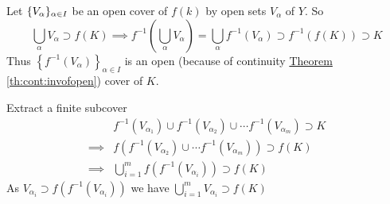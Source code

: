 \begin{myproof}
	Let $\{V_{\alpha}\}_{\alpha\in I}$ be an open cover of $f(k)$ by open sets $V_{\alpha}$ of $Y$. So $$\bigcup\limits_{\alpha}V_{\alpha} \supset f(K)\implies f^{-1}\left(\bigcup\limits_{\alpha}V_{\alpha}\right)=\bigcup\limits_{\alpha}f^{-1}\left(V_{\alpha}\right)\supset f^{-1}(f(K))\supset K$$ Thus $\left\{f^{-1}(V_{\alpha})\right\}_{\alpha\in I}$ is an open (because of continuity \hyperref[th:cont:invofopen]{Theorem \ref{th:cont:invofopen}}) cover of $K$.

	Extract a finite subcover \begin{align*}
		         & f^{-1}\left(V_{\alpha_1}\right)\cup f^{-1}\left(V_{\alpha_2}\right) \cup \cdots f^{-1}\left(V_{\alpha_m}\right)\supset K \\
		\implies & f\left(f^{-1}\left(V_{\alpha_2}\right) \cup \cdots f^{-1}\left(V_{\alpha_m}\right)\right)\supset f(K)                    \\
		\implies & \bigcup_{i=1}^m f\left(f^{-1}\left(V_{\alpha_i}\right)\right)\supset f(K)
	\end{align*}
	As $V_{\alpha_i}\supset f\left(f^{-1}\left(V_{\alpha_i}\right)\right)$ we have $\bigcup\limits_{i=1}^mV_{\alpha_i}\supset f(K)$
\end{myproof}



